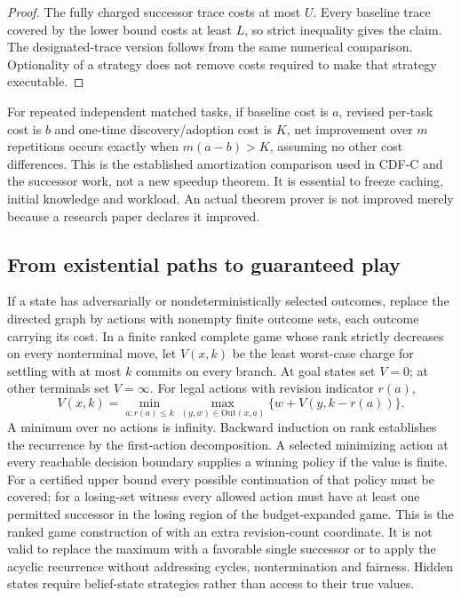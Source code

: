 \documentclass[11pt]{article}
\theoremstyle{remark}\newtheorem{remark}[theorem]{Remark}
\begin{document}
\begin{proof}
The fully charged successor trace costs at most $U$. Every baseline trace covered by the lower bound costs at least $L$, so strict inequality gives the claim. The designated-trace version follows from the same numerical comparison. Optionality of a strategy does not remove costs required to make that strategy executable.
\end{proof}
For repeated independent matched tasks, if baseline cost is $a$, revised per-task cost is $b$ and one-time discovery/adoption cost is $K$, net improvement over $m$ repetitions occurs exactly when $m(a-b)>K$, assuming no other cost differences. This is the established amortization comparison used in CDF-C and the successor work, not a new speedup theorem. It is essential to freeze caching, initial knowledge and workload. An actual theorem prover is not improved merely because a research paper declares it improved.

\subsection{From existential paths to guaranteed play}
If a state has adversarially or nondeterministically selected outcomes, replace the directed graph by actions with nonempty finite outcome sets, each outcome carrying its cost. In a finite ranked complete game whose rank strictly decreases on every nonterminal move, let $V(x,k)$ be the least worst-case charge for settling with at most $k$ commits on every branch. At goal states set $V=0$; at other terminals set $V=\infty$. For legal actions with revision indicator $r(a)$,
\[
 V(x,k)=\min_{a:r(a)\le k}\max_{(y,w)\in\mathrm{Out}(x,a)}\{w+V(y,k-r(a))\}.
\]
A minimum over no actions is infinity. Backward induction on rank establishes the recurrence by the first-action decomposition. A selected minimizing action at every reachable decision boundary supplies a winning policy if the value is finite. For a certified upper bound every possible continuation of that policy must be covered; for a losing-set witness every allowed action must have at least one permitted successor in the losing region of the budget-expanded game. This is the ranked game construction of \cite{infty} with an extra revision-count coordinate. It is not valid to replace the maximum with a favorable single successor or to apply the acyclic recurrence without addressing cycles, nontermination and fairness. Hidden states require belief-state strategies rather than access to their true values.
\end{document}
